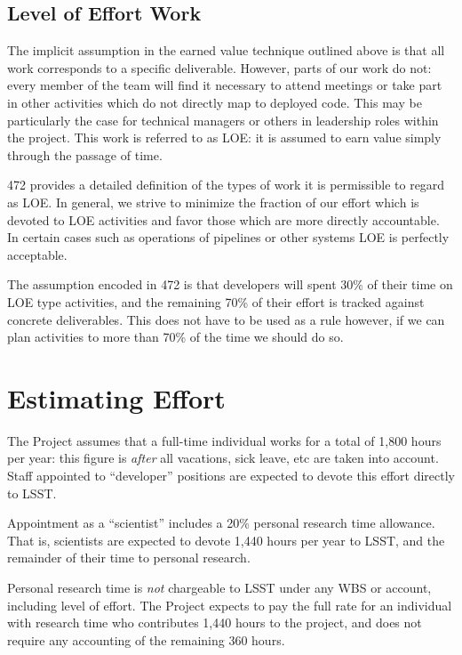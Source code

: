 \subsection{Level of Effort Work}
\label{sec:loe}

The implicit assumption in the earned value technique outlined above is
that all work corresponds to a specific deliverable. However, parts of
our work do not: every member of the team will find it necessary to
attend meetings or take part in other activities which do not directly
map to deployed code. This may be particularly the case for technical
managers or others in leadership roles within the project. This work is
referred to as LOE: it is assumed to earn value simply through the
passage of time.

472 provides a detailed definition of the types of work it is
permissible to regard as LOE. In general, we strive to minimize the
fraction of our effort which is devoted to LOE activities and favor
those which are more directly accountable. In certain cases such as
operations of pipelines or other systems LOE is perfectly acceptable.

The assumption encoded in 472 is that developers will spent 30\% of
their time on LOE type activities, and the remaining 70\% of their
effort is tracked against concrete deliverables. This does not have to
be used as a rule however, if we can plan activities to more than 70\%
of the time we should do so.

\section{Estimating Effort}
\label{sec:effort}

The Project assumes that a full-time individual works for a total of
1,800 hours per year: this figure is \emph{after} all vacations, sick
leave, etc are taken into account. Staff appointed to ``developer''
positions are expected to devote this effort directly to LSST.

Appointment as a ``scientist'' includes a 20\% personal research time
allowance. That is, scientists are expected to devote 1,440 hours per
year to LSST, and the remainder of their time to personal research.

Personal research time is \emph{not} chargeable to LSST under any WBS or
account, including level of effort. The Project expects to pay the full
rate for an individual with research time who contributes 1,440 hours to
the project, and does not require any accounting of the remaining 360
hours.

